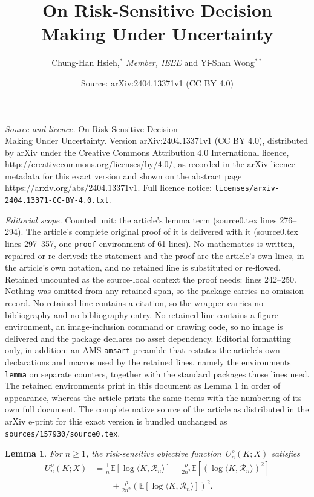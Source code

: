 \documentclass[10pt,a4paper]{amsart}
\title{On Risk-Sensitive Decision \\ Making Under Uncertainty}
\author{\large Chung-Han Hsieh,$^{*}$ \textit{Member, IEEE} and Yi-Shan Wong${}^{**}$}
\date{Source: arXiv:2404.13371v1 (CC BY 4.0)}
\newtheorem{lemma}{Lemma}
\begin{document}
\maketitle

\noindent\emph{Source and licence.} On Risk-Sensitive Decision \\ Making Under Uncertainty. Version arXiv:2404.13371v1 (CC BY 4.0), distributed by arXiv under the Creative Commons Attribution 4.0 International licence, http://creativecommons.org/licenses/by/4.0/, as recorded in the arXiv licence metadata for this exact version and shown on the abstract page https://arxiv.org/abs/2404.13371v1. Full licence notice: \texttt{licenses/arxiv-2404.13371-CC-BY-4.0.txt}.\par\smallskip

\noindent\textit{Editorial scope.} Counted unit: the article's lemma term (source0.tex lines 276--294). The article's complete original proof of it is delivered with it (source0.tex lines 297--357, one \texttt{proof} environment of 61 lines). No mathematics is written, repaired or re-derived: the statement and the proof are the article's own lines, in the article's own notation, and no retained line is substituted or re-flowed.  Retained uncounted as the source-local context the proof needs: lines 242--250.  Nothing was omitted from any retained span, so the package carries no omission record.  No retained line contains a citation, so the wrapper carries no bibliography and no bibliography entry.  No retained line contains a figure environment, an image-inclusion command or drawing code, so no image is delivered and the package declares no asset dependency.  Editorial formatting only, in addition: an AMS \texttt{amsart} preamble that restates the article's own declarations and macros used by the retained lines, namely the environments \texttt{lemma} on separate counters, together with the standard packages those lines need.  The retained environments print in this document as Lemma 1 in order of appearance, whereas the article prints the same items with the numbering of its own full document.  The complete native source of the article as distributed in the arXiv e-print for this exact version is bundled unchanged as \texttt{sources/157930/source0.tex}.
\begin{lemma} \label{lemma: equivalent risk-sensitive problem}
For $n\geq 1$,
    the risk-sensitive objective function~$U_n^\rho(K; X)$   satisfies
    \begin{align*}
	{U_n^\rho}(K; X) 
	&= \frac{1}{n}\mathbb{E}\left[ \log \langle K, \mathcal{R}_n \rangle  \right] - \frac{\rho}{2n^2}\mathbb{E}\left[ \left( \log\langle K, \mathcal{R}_n \rangle  \right)^2 \right] \\
	&\qquad + \frac{\rho}{2n^2}\left( \mathbb{E}\left[ \log\langle K, \mathcal{R}_n \rangle  \right] \right)^2.
\end{align*} 
\end{lemma}
\end{document}
